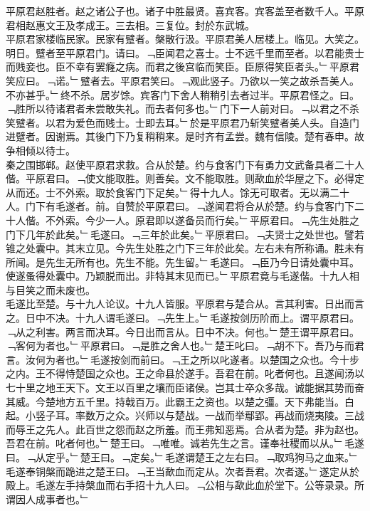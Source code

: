 \documentclass{zhvt-classic}
\begin{document}

\hspace*{2em}平原君赵胜者。赵之诸公子也。诸子中胜最贤。喜宾客。宾客盖至者数千人。平原君相赵惠文王及孝成王。三去相。三复位。封於东武城。\\
\hspace*{2em}平原君家楼临民家。民家有躄者。槃散行汲。平原君美人居楼上。临见。大笑之。明日。躄者至平原君门。请曰。﹁臣闻君之喜士。士不远千里而至者。以君能贵士而贱妾也。臣不幸有罢癃之病。而君之後宫临而笑臣。臣原得笑臣者头。﹂平原君笑应曰。﹁诺。﹂躄者去。平原君笑曰。﹁观此竖子。乃欲以一笑之故杀吾美人。不亦甚乎。﹂终不杀。居岁馀。宾客门下舍人稍稍引去者过半。平原君怪之。曰。﹁胜所以待诸君者未尝敢失礼。而去者何多也。﹂门下一人前对曰。﹁以君之不杀笑躄者。以君为爱色而贱士。士即去耳。﹂於是平原君乃斩笑躄者美人头。自造门进躄者。因谢焉。其後门下乃复稍稍来。是时齐有孟尝。魏有信陵。楚有春申。故争相倾以待士。\\
\hspace*{2em}秦之围邯郸。赵使平原君求救。合从於楚。约与食客门下有勇力文武备具者二十人偕。平原君曰。﹁使文能取胜。则善矣。文不能取胜。则歃血於华屋之下。必得定从而还。士不外索。取於食客门下足矣。﹂得十九人。馀无可取者。无以满二十人。门下有毛遂者。前。自赞於平原君曰。﹁遂闻君将合从於楚。约与食客门下二十人偕。不外索。今少一人。原君即以遂备员而行矣。﹂平原君曰。﹁先生处胜之门下几年於此矣。﹂毛遂曰。﹁三年於此矣。﹂平原君曰。﹁夫贤士之处世也。譬若锥之处囊中。其末立见。今先生处胜之门下三年於此矣。左右未有所称诵。胜未有所闻。是先生无所有也。先生不能。先生留。﹂毛遂曰。﹁臣乃今日请处囊中耳。使遂蚤得处囊中。乃颖脱而出。非特其末见而已。﹂平原君竟与毛遂偕。十九人相与目笑之而未废也。\\
\hspace*{2em}毛遂比至楚。与十九人论议。十九人皆服。平原君与楚合从。言其利害。日出而言之。日中不决。十九人谓毛遂曰。﹁先生上。﹂毛遂按剑历阶而上。谓平原君曰。﹁从之利害。两言而决耳。今日出而言从。日中不决。何也。﹂楚王谓平原君曰。﹁客何为者也。﹂平原君曰。﹁是胜之舍人也。﹂楚王叱曰。﹁胡不下。吾乃与而君言。汝何为者也。﹂毛遂按剑而前曰。﹁王之所以叱遂者。以楚国之众也。今十步之内。王不得恃楚国之众也。王之命县於遂手。吾君在前。叱者何也。且遂闻汤以七十里之地王天下。文王以百里之壤而臣诸侯。岂其士卒众多哉。诚能据其势而奋其威。今楚地方五千里。持戟百万。此霸王之资也。以楚之彊。天下弗能当。白起。小竖子耳。率数万之众。兴师以与楚战。一战而举鄢郢。再战而烧夷陵。三战而辱王之先人。此百世之怨而赵之所羞。而王弗知恶焉。合从者为楚。非为赵也。吾君在前。叱者何也。﹂楚王曰。﹁唯唯。诚若先生之言。谨奉社稷而以从。﹂毛遂曰。﹁从定乎。﹂楚王曰。﹁定矣。﹂毛遂谓楚王之左右曰。﹁取鸡狗马之血来。﹂毛遂奉铜槃而跪进之楚王曰。﹁王当歃血而定从。次者吾君。次者遂。﹂遂定从於殿上。毛遂左手持槃血而右手招十九人曰。﹁公相与歃此血於堂下。公等录录。所谓因人成事者也。﹂\\
\end{document}
